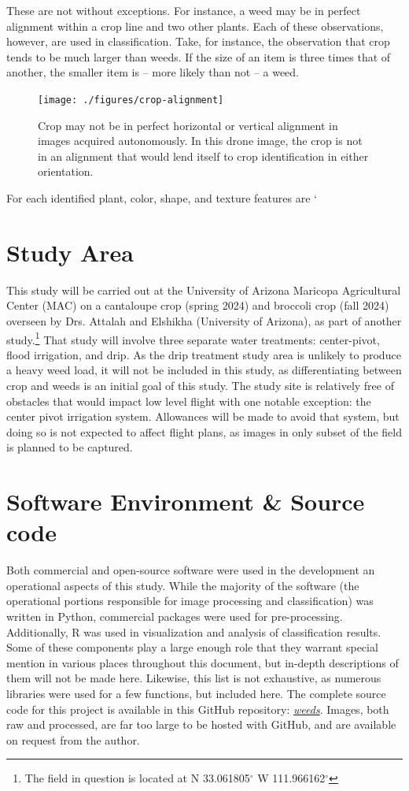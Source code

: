 \documentclass[letterpaper]{article}
\begin{document}
These are not without exceptions. For instance, a weed may be in perfect alignment within a crop line and two other plants. Each of these observations, however, are used in classification. Take, for instance, the observation that crop tends to be much larger than weeds. If the size of an item is three times that of another, the smaller item is -- more likely than not -- a weed.

\begin{figure}[H]
	\centering
	\texttt{[image: ./figures/crop-alignment]}
	\caption{Crop may not be in perfect horizontal or vertical alignment in images acquired autonomously. In this drone image, the crop is not in an alignment that would lend itself to crop identification in either orientation. }
	\label{fig:alignment}	
\end{figure}

For each identified plant, color, shape, and texture features are `

\section {Study Area}
This study will be carried out at the University of Arizona Maricopa Agricultural Center (MAC) on a cantaloupe crop (spring 2024) and broccoli crop (fall 2024) overseen by Drs. Attalah and Elshikha (University of Arizona), as part of another study.\footnote{The field in question is located at N 33.061805$^{\circ}$ W 111.966162$^{\circ}$} That study will involve three separate water treatments: center-pivot, flood irrigation, and drip. As the drip treatment study area is unlikely to produce a heavy weed load, it will not be included in this study, as differentiating between crop and weeds is an initial goal of this study. The study site is relatively free of obstacles that would impact low level flight with one notable exception: the center pivot irrigation system. Allowances will be made to avoid that system, but doing so is not expected to affect flight plans, as images in only subset of the field is planned to be captured.
 

\section{Software Environment \& Source code}
Both commercial and open-source software were used in the development an operational aspects of this study. While the majority of the software (the operational portions responsible for image processing and classification) was written in Python, commercial packages were used for pre-processing. Additionally, R was used in visualization and analysis of classification results. Some of these components play a large enough role that they warrant special mention in various places throughout this document, but in-depth descriptions of them will not be made here. Likewise, this list is not exhaustive, as numerous libraries were used for a few functions, but included here. The complete source code for this project is available in this GitHub repository: \href{https://github.com/evan-mcginnis/weeds}{\textit {weeds}}. Images, both raw and processed, are far too large to be hosted with GitHub, and are available on request from the author.
\end{document}
